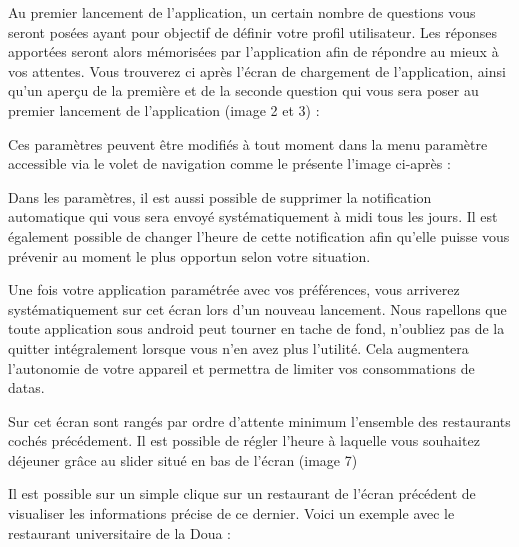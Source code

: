 Au premier lancement de l’application, un certain nombre de questions vous
seront posées ayant pour objectif de définir votre profil utilisateur. Les 
réponses apportées seront alors mémorisées par l’application afin de
répondre au mieux à vos attentes. Vous trouverez ci après l’écran de
chargement de l’application, ainsi qu’un aperçu de la première
et de la seconde question qui vous sera poser au premier lancement de
l’application (image 2 et 3) : 

Ces paramètres peuvent être modifiés à tout moment dans la menu paramètre
accessible via le volet de navigation comme le présente l’image ci-après : 

Dans les paramètres, il est aussi possible de supprimer la notification
automatique qui vous sera envoyé systématiquement à midi tous les jours. Il est
également possible de changer l’heure de cette notification afin qu’elle puisse vous
prévenir au moment le plus opportun selon votre situation. 

Une fois votre application paramétrée avec vos préférences, vous arriverez
systématiquement sur cet écran lors d’un nouveau lancement. Nous
rapellons que toute application sous android peut tourner en tache de fond,
n’oubliez pas de la quitter intégralement lorsque vous n’en avez plus l’utilité.
Cela augmentera l’autonomie de votre appareil et permettra de limiter vos
consommations de datas. 

Sur cet écran sont rangés par ordre d’attente minimum l’ensemble des
restaurants cochés précédement. Il est possible de régler l’heure à laquelle
vous souhaitez déjeuner grâce au slider situé en bas de l’écran (image 7)

Il est possible sur un simple clique sur un restaurant de l’écran précédent de
visualiser les informations précise de ce dernier. Voici un exemple avec le
restaurant universitaire de la Doua : 

